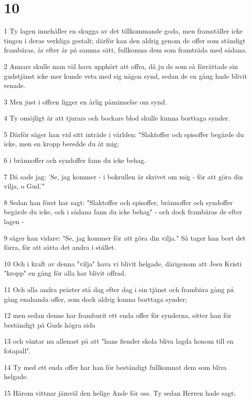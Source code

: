 \chapter{10}

\par 1 Ty lagen innehåller en skugga av det tillkommande goda, men framställer icke tingen i deras verkliga gestalt; därför kan den aldrig genom de offer som ständigt frambäras, år efter år på samma sätt, fullkomna dem som framträda med sådana.
\par 2 Annars skulle man väl hava upphört att offra, då ju de som så förrättade sin gudstjänst icke mer kunde veta med sig någon synd, sedan de en gång hade blivit renade.
\par 3 Men just i offren ligger en årlig påminnelse om synd.
\par 4 Ty omöjligt är att tjurars och bockars blod skulle kunna borttaga synder.
\par 5 Därför säger han vid sitt inträde i världen: "Slaktoffer och spisoffer begärde du icke, men en kropp beredde du åt mig;
\par 6 i brännoffer och syndoffer fann du icke behag.
\par 7 Då sade jag: 'Se, jag kommer - i bokrullen är skrivet om mig - för att göra din vilja, o Gud.'"
\par 8 Sedan han först har sagt: "Slaktoffer och spisoffer, brännoffer och syndoffer begärde du icke, och i sådana fann du icke behag" - och dock frambäras de efter lagen -
\par 9 säger han vidare: "Se, jag kommer för att göra din vilja." Så tager han bort det förra, för att sätta det andra i stället.
\par 10 Och i kraft av denna "vilja" hava vi blivit helgade, därigenom att Jesu Kristi "kropp" en gång för alla har blivit offrad.
\par 11 Och alla andra präster stå dag efter dag i sin tjänst och frambära gång på gång enahanda offer, som dock aldrig kunna borttaga synder;
\par 12 men sedan denne har framburit ett enda offer för synderna, sitter han för beständigt på Guds högra sida
\par 13 och väntar nu allenast på att "hans fiender skola bliva lagda honom till en fotapall".
\par 14 Ty med ett enda offer har han för beständigt fullkomnat dem som bliva helgade.
\par 15 Härom vittnar jämväl den helige Ande för oss. Ty sedan Herren hade sagt:
